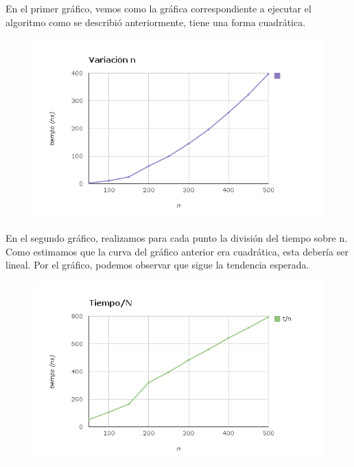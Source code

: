 \documentclass[10pt,a4paper]{article}
\begin{document}
En el primer gráfico, vemos como la gráfica correspondiente a ejecutar el algoritmo como se describió anteriormente, tiene una forma cuadrática.

\begin{figure}[h]
	\begin{center}
	   \includegraphics[scale=0.50]{n.png}
	\end{center}
\end{figure}	

En el segundo gráfico, realizamos para cada punto la división del tiempo sobre n. Como estimamos que la curva del gráfico anterior era cuadrática, esta debería ser lineal. Por el gráfico, podemos observar que sigue la tendencia esperada.

\begin{figure}[h]
	\begin{center}
	   \includegraphics[scale=0.50]{n_sobren.png}
	\end{center}
\end{figure}
\end{document}
